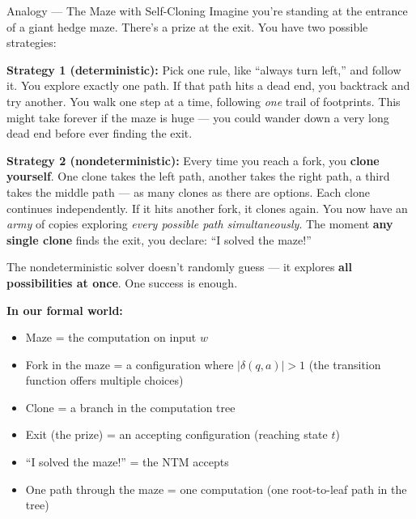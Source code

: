\begin{notebox}{Analogy --- The Maze with Self-Cloning}
Imagine you're standing at the entrance of a giant hedge maze. There's a prize
at the exit. You have two possible strategies:

\textbf{Strategy 1 (deterministic):} Pick one rule, like ``always turn left,''
and follow it. You explore exactly one path. If that path hits a dead end, you
backtrack and try another. You walk one step at a time, following \emph{one}
trail of footprints. This might take forever if the maze is huge --- you could
wander down a very long dead end before ever finding the exit.

\textbf{Strategy 2 (nondeterministic):} Every time you reach a fork, you
\textbf{clone yourself}. One clone takes the left path, another takes the
right path, a third takes the middle path --- as many clones as there are
options. Each clone continues independently. If it hits another fork, it clones
again. You now have an \emph{army} of copies exploring \emph{every possible
path simultaneously}. The moment \textbf{any single clone} finds the exit, you
declare: ``I solved the maze!''

The nondeterministic solver doesn't randomly guess --- it explores
\textbf{all possibilities at once}. One success is enough.

\textbf{In our formal world:}
\begin{itemize}[nosep]
\item Maze = the computation on input $w$
\item Fork in the maze = a configuration where $|\delta(q, a)| > 1$
  (the transition function offers multiple choices)
\item Clone = a branch in the computation tree
\item Exit (the prize) = an accepting configuration (reaching state $t$)
\item ``I solved the maze!'' = the NTM accepts
\item One path through the maze = one computation (one root-to-leaf path in the tree)
\end{itemize}
\end{notebox}

